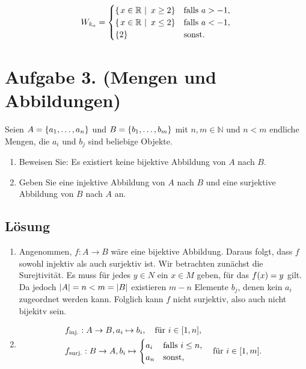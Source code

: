 \documentclass[german,12pt]{homework}
\newcommand{\NN}{\mathbb{N}}
\newcommand{\RR}{\mathbb{R}}
\DeclarePairedDelimiter{\absolute}{\lvert}{\rvert}
\DeclarePairedDelimiter{\enbrace}{(}{)}
\DeclarePairedDelimiter{\benbrace}{[}{]}
\DeclarePairedDelimiter{\penbrace}{\{}{\}}
\begin{document}
\begin{enumerate}
        \[W_{k_a} = \begin{cases}
            \penbrace*{\left.x \in \RR\ \right|\ x \ge 2} & \text{falls }a > -1,\\
            \penbrace*{\left.x \in \RR\ \right|\ x \le 2} & \text{falls }a < -1,\\
            \penbrace*{2} & \text{sonst.}
        \end{cases}\]
    \end{enumerate}

    \section*{Aufgabe 3. (Mengen und Abbildungen)}

    \begin{problem}
        Seien \(A = \penbrace*{a_1, \ldots, a_n}\) und \(B = \penbrace*{b_1, \ldots, b_m}\) mit \(n, m \in \NN\) und \(n < m\) endliche Mengen, die \(a_i\) und \(b_j\) sind beliebige Objekte.
        \begin{enumerate}
            \item Beweisen Sie: Es existiert keine bijektive Abbildung von \(A\) nach \(B\).
            \item Geben Sie eine injektive Abbildung von \(A\) nach \(B\) und eine surjektive Abbildung von \(B\) nach \(A\) an.
        \end{enumerate}
    \end{problem}

    \subsection*{Lösung}
    \begin{enumerate}
        \item Angenommen, \(f: A \to B\) wäre eine bijektive Abbildung. Daraus folgt, dass \(f\) sowohl injektiv als auch surjektiv ist. Wir betrachten zunächst die Surejtivität. Es muss für jedes \(y \in N\) ein \(x \in M\) geben, für das \(f\enbrace*{x} = y\) gilt. Da jedoch \(\absolute*{A} = n < m = \absolute*{B}\) existieren \(m - n\) Elemente \(b_j\), denen kein \(a_i\) zugeordnet werden kann. Folglich kann \(f\) nicht surjektiv, also auch nicht bijekitv sein.
        \item
        \begin{align*}
            &f_\text{inj.}: A \to B, a_i \mapsto b_i, \quad \text{für }i \in \benbrace*{1, n},\\
            &f_\text{surj.}: B \to A, b_i \mapsto \begin{cases}
                a_i & \text{falls }i \le n,\\
                a_n & \text{sonst,}
            \end{cases} \quad \text{für }i \in \benbrace*{1, m}.
        \end{align*}
    \end{enumerate}
\end{document}
